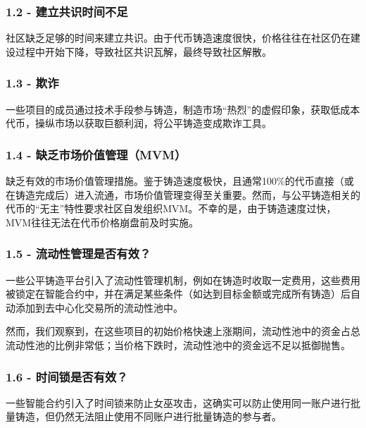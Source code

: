 \documentclass[
]{article}
\begin{document}
\subsubsection{1.2 -
建立共识时间不足}\label{ux5efaux7acbux5171ux8bc6ux65f6ux95f4ux4e0dux8db3}

社区缺乏足够的时间来建立共识。由于代币铸造速度很快，价格往往在社区仍在建设过程中开始下降，导致社区共识瓦解，最终导致社区解散。

\subsubsection{1.3 - 欺诈}\label{ux6b3aux8bc8}

一些项目的成员通过技术手段参与铸造，制造市场``热烈''的虚假印象，获取低成本代币，操纵市场以获取巨额利润，将公平铸造变成欺诈工具。

\subsubsection{1.4 -
缺乏市场价值管理（MVM）}\label{ux7f3aux4e4fux5e02ux573aux4ef7ux503cux7ba1ux7406mvm}

缺乏有效的市场价值管理措施。鉴于铸造速度极快，且通常100\%的代币直接（或在铸造完成后）进入流通，市场价值管理变得至关重要。然而，与公平铸造相关的代币的``无主''特性要求社区自发组织MVM。不幸的是，由于铸造速度过快，MVM往往无法在代币价格崩盘前及时实施。

\subsubsection{1.5 -
流动性管理是否有效？}\label{ux6d41ux52a8ux6027ux7ba1ux7406ux662fux5426ux6709ux6548}

一些公平铸造平台引入了流动性管理机制，例如在铸造时收取一定费用，这些费用被锁定在智能合约中，并在满足某些条件（如达到目标金额或完成所有铸造）后自动添加到去中心化交易所的流动性池中。

然而，我们观察到，在这些项目的初始价格快速上涨期间，流动性池中的资金占总流动性池的比例非常低；当价格下跌时，流动性池中的资金远不足以抵御抛售。

\subsubsection{1.6 -
时间锁是否有效？}\label{ux65f6ux95f4ux9501ux662fux5426ux6709ux6548}

一些智能合约引入了时间锁来防止女巫攻击，这确实可以防止使用同一账户进行批量铸造，但仍然无法阻止使用不同账户进行批量铸造的参与者。
\end{document}
